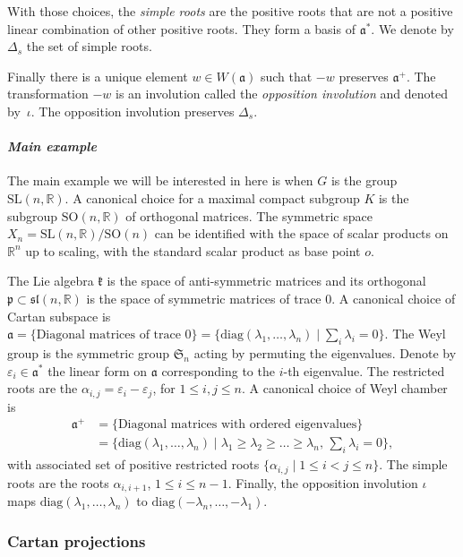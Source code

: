 \documentclass[JEP,XML,SOM,Unicode,NoEqCountersInSection,NoFloatCountersInSection,published]{cedram}
\theoremstyle{definition}
\newcommand{\R}{\mathbb{R}}
\newcommand{\diag}{\mathrm{diag}}
\newcommand{\SL}{\mathrm{SL}}
\newcommand{\SO}{\mathrm{SO}}
\newcommand{\fa}{\mathfrak{a}}
\newcommand{\fp}{\mathfrak{p}}
\newcommand{\fk}{\mathfrak{k}}
\let\epsilon\varepsilon
\let\op\iota
\begin{document}
With those choices, the \emph{simple roots} are the positive roots that are not a positive linear combination of other positive roots. They form a basis of $\fa^*$. We denote by $\Delta_s$ the set of simple roots.

Finally there is a unique element $w\in W(\fa)$ such that $-w$ preserves $\fa^+$. The transformation $-w$ is an involution called the \emph{opposition involution} and denoted by~$\op$. The opposition involution preserves $\Delta_s$.

\paragraph{\textit{Main example}} The main example we will be interested in here is when $G$ is the group $\SL(n,\R)$. A canonical choice for a maximal compact subgroup $K$ is the subgroup $\SO(n,\R)$ of orthogonal matrices. The symmetric space $X_n = \SL(n,\R)/\SO(n)$ can be identified with the space of scalar products on $\R^n$ up to scaling, with the standard scalar product as base point $o$.

The Lie algebra $\fk$ is the space of anti-symmetric matrices and its orthogonal $\fp \subset \mathfrak{sl}(n,\R)$ is the space of symmetric matrices of trace $0$. A canonical choice of Cartan subspace is $\fa= \{\textrm{Diagonal matrices of trace $0$}\}= \{ \diag(\lambda_1, \dots , \lambda_n)\mid \sum_i \lambda_i=0\} $. The Weyl group is the symmetric group $\mathfrak{S}_n$ acting by permuting the eigenvalues. Denote by $\epsilon_i\in \fa^*$ the linear form on $\fa$ corresponding to the $i$-th eigenvalue. The restricted roots are the $\alpha_{i,j}=\epsilon_i - \epsilon_j$, for $1\leq i, j \leq n$. A canonical choice of Weyl chamber is
\begin{align*}
\fa^+ &=\{\textrm{Diagonal matrices with ordered eigenvalues}\}\\
&=\{ \diag(\lambda_1, \dots , \lambda_n)\mid \lambda_1 \geq \lambda_2\geq \ldots \geq \lambda_n, \, \sum_i \lambda_i=0\},
\end{align*}
with associated set of positive restricted roots $\{\alpha_{i,j}\mid 1\leq i < j \leq n\}$. The simple roots are the roots $\alpha_{i,i+1}$, $1\leq i \leq n-1$. Finally, the opposition involution $\op$ maps $\diag(\lambda_1,\ldots, \lambda_n)$ to $\diag(-\lambda_n,\ldots, -\lambda_1)$.

\subsubsection{Cartan projections}
\end{document}
